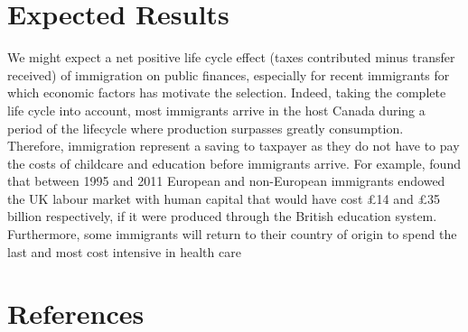   \section*{Expected Results}\label{sec:results}
  We might expect a net positive life cycle effect (taxes contributed minus transfer received) of immigration on public finances, especially for recent immigrants for which economic factors has motivate the selection. Indeed, taking the complete life cycle into account, most immigrants arrive in the host Canada during a period of the lifecycle where production surpasses greatly consumption. Therefore, immigration represent a saving to taxpayer as they do not have to pay the costs of childcare and education before immigrants arrive. For example, \citet{Dustmann:2014dr} found that between 1995 and 2011 European and non-European immigrants endowed the UK labour market with human capital that would have cost £14 and £35 billion respectively, if it were produced through the British education system. Furthermore, some immigrants will return to their country of origin to spend the last and most cost intensive in health care \citep{Bratsberg:2014cl}

  \newpage
  \section*{References}
    \printbibliography[heading=none]

